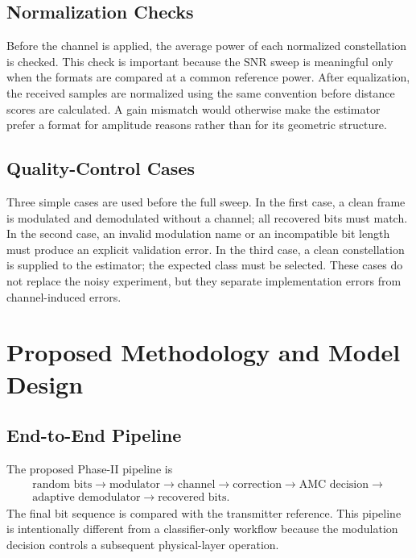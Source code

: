 \documentclass[12pt,twoside,openright]{report}
\begin{document}
\section{Normalization Checks}
Before the channel is applied, the average power of each normalized
constellation is checked. This check is important because the SNR sweep is
meaningful only when the formats are compared at a common reference power.
After equalization, the received samples are normalized using the same
convention before distance scores are calculated. A gain mismatch would
otherwise make the estimator prefer a format for amplitude reasons rather
than for its geometric structure.

\section{Quality-Control Cases}
Three simple cases are used before the full sweep. In the first case, a
clean frame is modulated and demodulated without a channel; all recovered
bits must match. In the second case, an invalid modulation name or an
incompatible bit length must produce an explicit validation error. In the
third case, a clean constellation is supplied to the estimator; the
expected class must be selected. These cases do not replace the noisy
experiment, but they separate implementation errors from channel-induced
errors.

\chapter{Proposed Methodology and Model Design}

\section{End-to-End Pipeline}
The proposed Phase-II pipeline is
\begin{equation}
\begin{aligned}
\text{random bits}
\rightarrow\text{modulator}
\rightarrow\text{channel}
\rightarrow\text{correction}
\rightarrow\text{AMC decision}
\rightarrow{}\\
\text{adaptive demodulator}
\rightarrow\text{recovered bits}.
\end{aligned}
\end{equation}
The final bit sequence is compared with the transmitter reference. This
pipeline is intentionally different from a classifier-only workflow because
the modulation decision controls a subsequent physical-layer operation.
\end{document}
